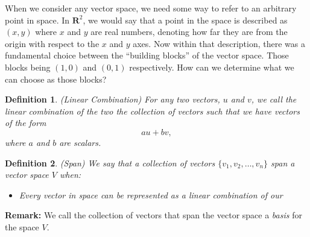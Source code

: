 \documentclass{article}
\newtheorem{definition}{Definition}
\begin{document}
When we consider any vector space, we need some way to refer to an arbitrary point in space. In $\mathbf{R}^2$, we would say that a point in the space is described as $(x,y)$ where $x$ and $y$ are real numbers, denoting how far they are from the origin with respect to the $x$ and $y$ axes. Now within that description, there was a fundamental choice between the ``building blocks'' of the vector space. Those blocks being $(1,0)$ and $(0,1)$ respectively. How can we determine what we can choose as those blocks? 
\begin{definition}
		(Linear Combination) For any two vectors, $u$ and $v$, we call the linear combination of the two the collection of vectors such that we have vectors of the form \[au+bv,\] where $a$ and $b$ are scalars.
\end{definition}	
\begin{definition}
		(Span) We say that a collection of vectors $\{v_1,v_2,\dots,v_n\}$ span a vector space $V$ when:
		\begin{itemize}
				\item Every vector in space can be represented as a linear combination of our 
		\end{itemize}	
\end{definition}	
\textbf{Remark:} We call the collection of vectors that span the vector space a \emph{basis} for the space $V$. 
\newpage
\end{document}
